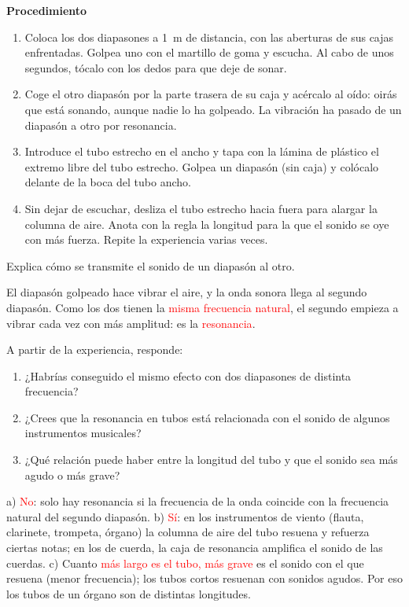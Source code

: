 \medskip

\textbf{Procedimiento}
\begin{enumerate}[label=\numberballgreen]
    \item Coloca los dos diapasones a \qty{1}{\m} de distancia, con las aberturas de sus cajas enfrentadas. Golpea uno con el martillo de goma y escucha. Al cabo de unos segundos, tócalo con los dedos para que deje de sonar.
    \item Coge el otro diapasón por la parte trasera de su caja y acércalo al oído: oirás que está sonando, aunque nadie lo ha golpeado. La vibración ha pasado de un diapasón a otro por resonancia.
    \item Introduce el tubo estrecho en el ancho y tapa con la lámina de plástico el extremo libre del tubo estrecho. Golpea un diapasón (sin caja) y colócalo delante de la boca del tubo ancho.
    \item Sin dejar de escuchar, desliza el tubo estrecho hacia fuera para alargar la columna de aire. Anota con la regla la longitud para la que el sonido se oye con más fuerza. Repite la experiencia varias veces.
\end{enumerate}

\begin{exercise}
    Explica cómo se transmite el sonido de un diapasón al otro.
    \begin{solu}
        El diapasón golpeado hace vibrar el aire, y la onda sonora llega al segundo diapasón. Como los dos tienen la \textcolor{red}{misma frecuencia natural}, el segundo empieza a vibrar cada vez con más amplitud: es la \textcolor{red}{resonancia}.
    \end{solu}
\end{exercise}

\begin{exercise}
    A partir de la experiencia, responde:
    \begin{enumerate}[label=\alph*)]
        \item ¿Habrías conseguido el mismo efecto con dos diapasones de distinta frecuencia?
        \item ¿Crees que la resonancia en tubos está relacionada con el sonido de algunos instrumentos musicales?
        \item ¿Qué relación puede haber entre la longitud del tubo y que el sonido sea más agudo o más grave?
    \end{enumerate}
    \begin{solu}
        a) \textcolor{red}{No}: solo hay resonancia si la frecuencia de la onda coincide con la frecuencia natural del segundo diapasón.
        b) \textcolor{red}{Sí}: en los instrumentos de viento (flauta, clarinete, trompeta, órgano) la columna de aire del tubo resuena y refuerza ciertas notas; en los de cuerda, la caja de resonancia amplifica el sonido de las cuerdas.
        c) Cuanto \textcolor{red}{más largo es el tubo, más grave} es el sonido con el que resuena (menor frecuencia); los tubos cortos resuenan con sonidos agudos. Por eso los tubos de un órgano son de distintas longitudes.
    \end{solu}
\end{exercise}

